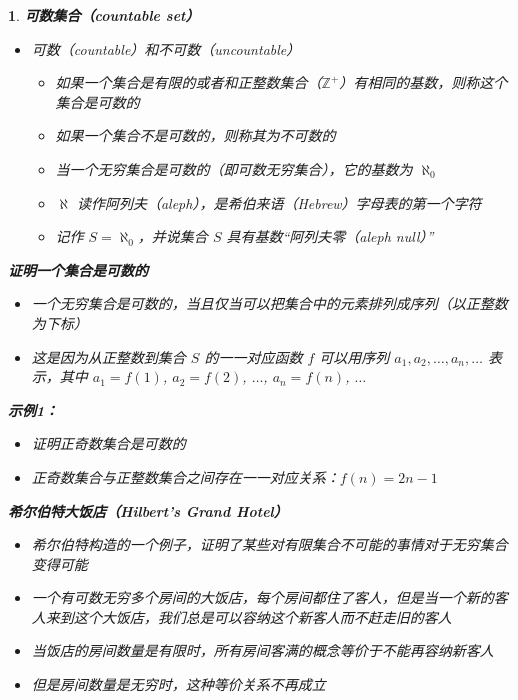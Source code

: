 \documentclass[UTF8]{report}
\theoremstyle{MyLineTheoremStyle} %
\theoremstyle{MyBlockTheoremStyle} %
\theoremstyle{MySubsubsectionStyle} %
\newtheorem{definition}{}
\begin{document}
\begin{definition}
    \textbf{可数集合（countable set）}\par
    \begin{itemize}
        \item 可数（countable）和不可数（uncountable）
        \begin{itemize}
            \item 如果一个集合是有限的或者和正整数集合（$\mathbb{Z}^+$）有相同的基数，则称这个集合是可数的
            \item 如果一个集合不是可数的，则称其为不可数的
            \item 当一个无穷集合是可数的（即可数无穷集合），它的基数为 $\aleph_0$
            \item $\aleph$ 读作阿列夫（aleph），是希伯来语（Hebrew）字母表的第一个字符
            \item 记作 $S = \aleph_0$，并说集合 $S$ 具有基数“阿列夫零（aleph null）”
        \end{itemize}
    \end{itemize}

    \textbf{证明一个集合是可数的}\par
    \begin{itemize}
        \item 一个无穷集合是可数的，当且仅当可以把集合中的元素排列成序列（以正整数为下标）
        \item 这是因为从正整数到集合 $S$ 的一一对应函数 $f$ 可以用序列 $a_1, a_2, \ldots, a_n, \ldots$ 表示，其中 $a_1 = f(1)$, $a_2 = f(2)$, $\ldots$, $a_n = f(n)$, $\ldots$
    \end{itemize}

    \textbf{示例1：}\par
    \begin{itemize}
        \item 证明正奇数集合是可数的
        \item 正奇数集合与正整数集合之间存在一一对应关系：$f(n) = 2n - 1$
    \end{itemize}

    \textbf{希尔伯特大饭店（Hilbert’s Grand Hotel）}\par
    \begin{itemize}
        \item 希尔伯特构造的一个例子，证明了某些对有限集合不可能的事情对于无穷集合变得可能
        \item 一个有可数无穷多个房间的大饭店，每个房间都住了客人，但是当一个新的客人来到这个大饭店，我们总是可以容纳这个新客人而不赶走旧的客人
        \item 当饭店的房间数量是有限时，所有房间客满的概念等价于不能再容纳新客人
        \item 但是房间数量是无穷时，这种等价关系不再成立
    \end{itemize}


\end{definition}
\end{document}
